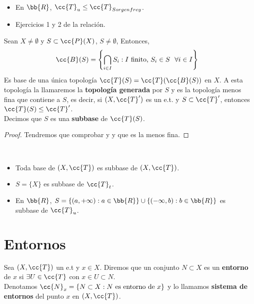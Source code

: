 \begin{ejemplo}\
    \begin{itemize}
        \item En $\bb{R}$, $\cc{T}_u \leq \cc{T}_{Sorgenfrey}$.
        \item Ejercicios 1 y 2 de la relación.
    \end{itemize}
    \endsquare
\end{ejemplo}

\begin{prop}
    Sean $X\neq \emptyset$ y $S\subset \cc{P}(X)$, $S\neq \emptyset$, Entonces, 
    \begin{gather*}
        \cc{B}(S)=\left\{\bigcap\limits_{i\in I}S_i: I \text{ finito, }S_i \in S\ \ \forall i \in I\right\}
    \end{gather*}
    Es base de una única topología $\cc{T}(S)=\cc{T}(\cc{B}(S))$ en $X$. A esta topología la llamaremos la \textbf{topología generada} por $S$ y es la topología menos fina que contiene a $S$, es decir, si $(X,\cc{T}')$ es un e.t. y $S\subset \cc{T}'$, entonces $\cc{T}(S)\leq \cc{T}'$.\\

    Decimos que $S$ es una \textbf{subbase} de $\cc{T}(S)$.

    \begin{proof}
        Tendremos que comprobar  y  y que es la menos fina.
    \end{proof}
\end{prop}

\begin{ejemplo}\
    \begin{itemize}
        \item Toda base de $(X,\cc{T})$ es subbase de $(X,\cc{T})$.
        \item $S=\{X\}$ es subbase de $\cc{T}_t$.
        \item En $\bb{R}$, $S=\{(a,+\infty):a\in \bb{R}\}\cup \{(-\infty,b): b\in \bb{R}\}$ es subbase de $\cc{T}_u$.
    \end{itemize}
    \endsquare
\end{ejemplo}

\section{Entornos}

\begin{definicion}
    Sea $(X, \cc{T})$ un e.t y $x\in X$. Diremos que un conjunto $N\subset X$ es un \textbf{entorno} de $x$ si $\exists U \in \cc{T}$ con $x\in U \subset N$.\\

    Denotamos $\cc{N}_x = \{N\subset X : N \text{ es entorno de }x\}$ y lo llamamos \textbf{sistema de entornos} del punto $x$ en $(X,\cc{T})$.
    \endsquare 
\end{definicion}

